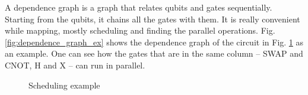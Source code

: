 \begin{itemize}
A dependence graph is a graph that relates qubits and gates sequentially.
Starting from the qubits, it chains all the gates with them.
It is really convenient while mapping, mostly scheduling and finding the parallel operations.
Fig. \ref{fig:dependence_graph_ex} shows the dependence graph of the circuit in Fig. \ref{fig:scheduling_ex} as an example.
One can see how the gates that are in the same column -- SWAP and CNOT, H and X -- can run in parallel.

\begin{figure}
    \centering

\label{fig:scheduling_ex_orig}

\label{fig:scheduling_ex_asap}

\label{fig:scheduling_ex_alap}

\caption{Scheduling example}
\label{fig:scheduling_ex}
\end{figure}


\begin{figure}
\centering
\resizebox{.3\textwidth}{!}{%
\begin{tikzpicture}
    

\end{tikzpicture}}
\end{figure}
\end{itemize}
